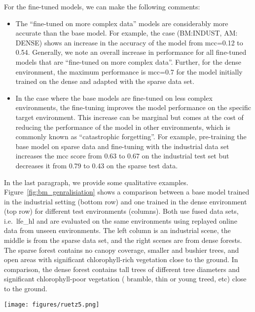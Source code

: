 For the fine-tuned models, we can make the following comments:
\begin{itemize}
 \item The ``fine-tuned on more complex data'' models are considerably more accurate than the base model. For example, the case (BM:INDUST, AM: DENSE) shows an increase in the accuracy of the model from \ac{mcc}=0.12 to 0.54. Generally, we note an overall increase in performance for all fine-tuned models that are ``fine-tuned on more complex data''. Further, for the dense environment, the maximum performance is \ac{mcc}=0.7 for the model initially trained on the dense and adapted with the sparse data set.   
 \item In the case where the base models are fine-tuned on less complex environments, the fine-tuning improves the model performance on the specific target environment. This increase can be marginal but comes at the cost of reducing the performance of the model in other environments, which is commonly known as ``catastrophic forgetting''. For example, pre-training the base model on sparse data and fine-tuning with the industrial data set increases the \ac{mcc} score from 0.63 to 0.67 on the industrial test set but decreases it from 0.79 to 0.43 on the sparse test data.
\end{itemize}

In the last paragraph, we provide some qualitative examples. Figure~\ref{fig:bm_genralisiation} shows a comparison between a base model trained in the industrial setting (bottom row) and one trained in the dense environment (top row) for different test environments (columns). Both use fused data sets, i.e.~\ac{lfe_hl} and are evaluated on the same environments using replayed online data from unseen environments. The left column is an industrial scene, the middle is from the sparse data set, and the right scenes are from dense forests. The sparse forest contains no canopy coverage, smaller and bushier trees, and open areas with significant chlorophyll-rich vegetation close to the ground.  In comparison, the dense forest contains tall trees of different tree diameters and significant chlorophyll-poor vegetation ( bramble, thin or young treed, etc) close to the ground.

\begin{figure*}[h]
 \centering
 \texttt{[image: figures/ruetz5.png]}
 \caption[Generalisation of Models to Different Environments]{Comparison of two ensembles of models trained on either the dense data set in the top row (A, B, C) or the industrial data set in the bottom row (D, E, F). The left column shows each model's TE in an industrial environment, the middle and right columns show the TE of two densely vegetated environments with a variation of tree sizes and underbrush.}
 \label{fig:bm_genralisiation}
\end{figure*}

